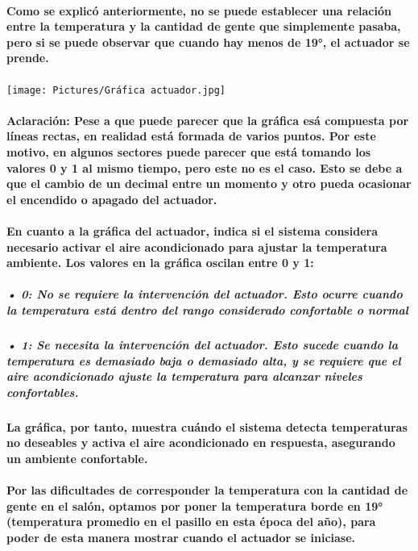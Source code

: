 \documentclass[12pt]{article} %
\newcommand{\normalsubparagraph}[1]{\subparagraph{\textnormal{#1}}}
\newcommand{\normalparagraph}[1]{\paragraph{\textnormal{#1}}}
\begin{document}
\normalparagraph{Como se explicó anteriormente, no se puede establecer una relación entre la temperatura y la cantidad de gente que simplemente pasaba, pero si se puede observar que cuando hay menos de 19°, el actuador se prende.}

\begin{center}
\begin{minipage}[c]{0.60\textwidth} %
  \centering
  \texttt{[image: Pictures/Gráfica actuador.jpg]}
  \label{fig:grafica-actuador}
\end{minipage}
\end{center}


\paragraph{Aclaración: Pese a que puede parecer que la gráfica esá compuesta por líneas rectas, en realidad está formada de varios puntos. Por este motivo, en algunos sectores puede parecer que está tomando los valores 0 y 1 al mismo tiempo, pero este no es el caso. Esto se debe a que el cambio de un decimal entre un momento y otro pueda ocasionar el encendido o apagado del actuador.}

\normalparagraph{En cuanto a la gráfica del actuador, indica si el sistema considera necesario activar el aire acondicionado para ajustar la temperatura ambiente. Los valores en la gráfica oscilan entre 0 y 1:}
\normalsubparagraph{  •	0: No se requiere la intervención del actuador. Esto ocurre cuando la temperatura está dentro del rango considerado confortable o normal}
\normalsubparagraph{ • 1: Se necesita la intervención del actuador. Esto sucede cuando la temperatura es demasiado baja o demasiado alta, y se requiere que el aire acondicionado ajuste la temperatura para alcanzar niveles confortables.}

\normalparagraph{La gráfica, por tanto, muestra cuándo el sistema detecta temperaturas no deseables y activa el aire acondicionado en respuesta, asegurando un ambiente confortable.}

\normalparagraph{Por las dificultades de corresponder la temperatura con la cantidad de gente en el salón, optamos por poner la temperatura borde en 19° (temperatura promedio en el pasillo en esta época del año), para poder de esta manera mostrar cuando el actuador se iniciase.}
\end{document}
